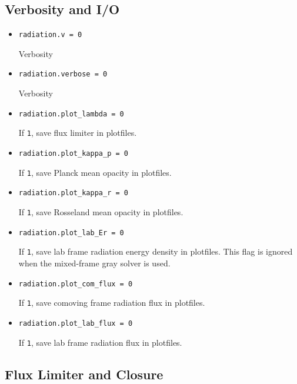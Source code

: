 \documentclass[11pt,letterpaper]{article}
\begin{document}
\subsection{Verbosity and I/O}
\label{sec:bothpar}

\begin{itemize}
\item {\tt radiation.v = 0}
  
  Verbosity

\item {\tt radiation.verbose = 0}
  
  Verbosity

\item {\tt radiation.plot\_lambda = 0}
  
  If {\tt 1}, save flux limiter in plotfiles.

\item {\tt radiation.plot\_kappa\_p = 0}

  If {\tt 1}, save Planck mean opacity in plotfiles.

\item {\tt radiation.plot\_kappa\_r = 0}

  If {\tt 1}, save Rosseland mean opacity in plotfiles.

\item {\tt radiation.plot\_lab\_Er = 0}
  
  If {\tt 1}, save lab frame radiation energy density in plotfiles.
  This flag is ignored when the mixed-frame gray solver is used.

\item {\tt radiation.plot\_com\_flux = 0}
  
  If {\tt 1}, save comoving frame radiation flux in plotfiles.

\item {\tt radiation.plot\_lab\_flux = 0}

  If {\tt 1}, save lab frame radiation flux in plotfiles.

\end{itemize}


\subsection{Flux Limiter and Closure}

\label{sec:fluxlimiter}
\end{document}
